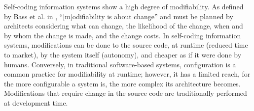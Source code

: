 \documentclass[sigconf]{acmart}
\theoremstyle{definition}
\begin{document}
Self-coding information systems show a high degree of modifiability. As defined by Bass et al. in \cite{bass2013software}, ``[m]odifiability is about change'' and must be planned by architects considering what can change, the likelihood of the change, when and by whom the change is made, and the change costs. In self-coding information systems, modifications can be done to the source code, at runtime (reduced time to market), by the system itself (autonomy), and cheaper as if it were done by humans. Conversely, in traditional software-based systems, configuration is a common practice for modifiability at runtime; however, it has a limited reach, for the more configurable a system is, the more complex its architecture becomes. Modifications that require change in the source code are traditionally performed at development time.



\end{document}
